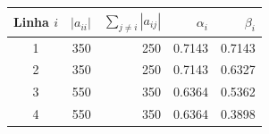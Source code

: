\begin{tabular}{crrrr}
\toprule
Linha $i$ & $|a_{ii}|$ & $\sum_{j\neq i}|a_{ij}|$ & $\alpha_i$ & $\beta_i$ \\
\midrule
1 & \num{350} & \num{250} & \num{0.7143} & \num{0.7143} \\
2 & \num{350} & \num{250} & \num{0.7143} & \num{0.6327} \\
3 & \num{550} & \num{350} & \num{0.6364} & \num{0.5362} \\
4 & \num{550} & \num{350} & \num{0.6364} & \num{0.3898} \\
\bottomrule
\end{tabular}
